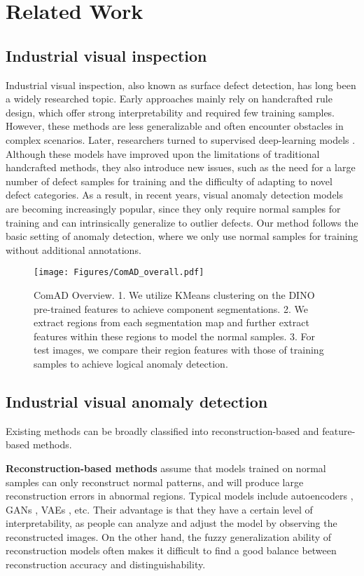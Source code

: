 \documentclass[final,5p,times,twocolumn]{elsarticle}
\begin{document}
\section{Related Work}
\label{2}
\subsection{Industrial visual inspection}
\label{2.1}
Industrial visual inspection, also known as surface defect detection, has long been a widely researched topic. Early approaches \cite{xie2008review, kumar2008computer} mainly rely on handcrafted rule design, which offer strong interpretability and required few training samples. However, these methods are less generalizable and often encounter obstacles in complex scenarios. Later, researchers turned to supervised deep-learning models \cite{azizah2017deep,bovzivc2021mixed}. Although these models have improved upon the limitations of traditional handcrafted methods, they also introduce new issues, such as the need for a large number of defect samples for training and the difficulty of adapting to novel defect categories. As a result, in recent years, visual anomaly detection models are becoming increasingly popular, since they only require normal samples for training and can intrinsically generalize to outlier defects. Our method follows the basic setting of anomaly detection, where we only use normal samples for training without additional annotations.

\begin{figure*}[t]
\centering
		\texttt{[image: Figures/ComAD\_overall.pdf]}\caption{ComAD Overview. 1. We utilize KMeans clustering on the DINO pre-trained features to achieve component segmentations. 2. We extract regions from each segmentation map and further extract features within these regions to model the normal samples. 3. For test images, we compare their region features with those of training samples to achieve logical anomaly detection.}
	\label{FIG:3}
\end{figure*}

\subsection{Industrial visual anomaly detection}
\label{2.2}
Existing methods can be broadly classified into reconstruction-based and feature-based methods.

\textbf{Reconstruction-based methods} assume that models trained on normal samples can only reconstruct normal patterns, and will produce large reconstruction errors in abnormal regions. Typical models include autoencoders \cite{bergmann2018improving, zavrtanik2021reconstruction, zavrtanik2021draem, liu2022reconstruction, luo2023normal}, GANs \cite{schlegl2019f}, VAEs \cite{venkataramanan2020attention}, etc. Their advantage is that they have a certain level of interpretability, as people can analyze and adjust the model by observing the reconstructed images. On the other hand, the fuzzy generalization ability of reconstruction models often makes it difficult to find a good balance between reconstruction accuracy and distinguishability.  
\end{document}
